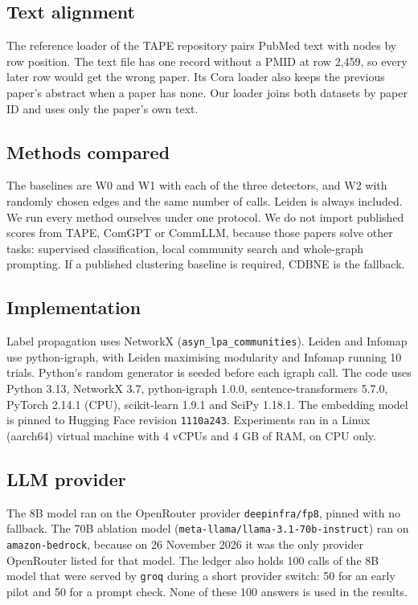 \documentclass[journal]{IEEEtran}
\begin{document}
\subsection{Text alignment}
The reference loader of the TAPE repository pairs PubMed text with nodes by row position. The text file has one record without a PMID at row 2,459, so every later row would get the wrong paper. Its Cora loader also keeps the previous paper's abstract when a paper has none. Our loader joins both datasets by paper ID and uses only the paper's own text.

\subsection{Methods compared}
The baselines are W0 and W1 with each of the three detectors, and W2 with randomly chosen edges and the same number of calls. Leiden is always included. We run every method ourselves under one protocol. We do not import published scores from TAPE, ComGPT or CommLLM, because those papers solve other tasks: supervised classification, local community search and whole-graph prompting. If a published clustering baseline is required, CDBNE \cite{zhou2023} is the fallback.

\subsection{Implementation}
Label propagation uses NetworkX (\texttt{asyn\_lpa\_communities}). Leiden and Infomap use python-igraph, with Leiden maximising modularity and Infomap running 10 trials. Python's random generator is seeded before each igraph call. The code uses Python 3.13, NetworkX 3.7, python-igraph 1.0.0, sentence-transformers 5.7.0, PyTorch 2.14.1 (CPU), scikit-learn 1.9.1 and SciPy 1.18.1. The embedding model is pinned to Hugging Face revision \texttt{1110a243}. Experiments ran in a Linux (aarch64) virtual machine with 4 vCPUs and 4 GB of RAM, on CPU only.

\subsection{LLM provider}
The 8B model ran on the OpenRouter provider \texttt{deepinfra/fp8}, pinned with no fallback. The 70B ablation model (\texttt{meta-llama/llama-3.1-70b-instruct}) ran on \texttt{amazon-bedrock}, because on 26 November 2026 it was the only provider OpenRouter listed for that model. The ledger also holds 100 calls of the 8B model that were served by \texttt{groq} during a short provider switch: 50 for an early pilot and 50 for a prompt check. None of these 100 answers is used in the results.
\end{document}
